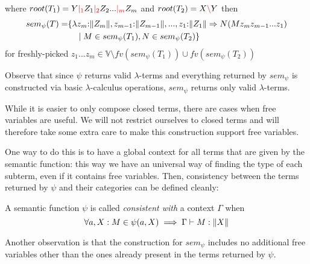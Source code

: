 \documentclass[main.tex]{subfiles}
\begin{document}
\begin{defn}
\begin{enumerate}
\begin{center}
            \end{center}
            where $root(T_1) = Y \textcolor{red}{|_{1}} Z_1 \textcolor{red}{|_{2}} Z_2 ... \textcolor{red}{|_{m}} Z_m$ and $root(T_2) = X \textcolor{red}{\backslash} Y$ then
            \[
                \begin{split}
                    sem_{\psi}(T) =& \{
                        \lambda z_m {:} \|Z_m\|, z_{m - 1} {:} \|Z_{m - 1}\|, ..., z_1 {:} \|Z_1\| \Rightarrow
                        N ( M z_m z_{m - 1} ... z_1 ) \\
                        & \quad \mid M \in sem_{\psi}(T_1), N \in sem_{\psi}(T_2) \} \\
                \end{split}
            \]
            for freshly-picked
            $z_1 ... z_m \in \mathbb{V} \setminus fv(sem_{\psi}(T_1)) \cup fv(sem_{\psi}(T_2))$
    \end{enumerate}
\end{defn}

Observe that since $\psi$ returns valid $\lambda$-terms and everything
returned by $sem_{\psi}$ is constructed via basic $\lambda$-calculus operations,
$sem_{\psi}$ returns only valid $\lambda$-terms.

While it is easier to only compose closed terms, there are cases when free
variables are useful. We will not restrict ourselves to closed terms and will
therefore take some extra care to make this construction support free variables.

One way to do this is to have a global context for all terms that are given
by the semantic function: this way we have an universal way of finding the
type of each subterm, even if it contains free variables. Then, consistency
between the terms returned by $\psi$ and their categories can be defined
cleanly:

\begin{defn}
    A semantic function $\psi$ is called \emph{consistent with} a context
    $\Gamma$ when
    \[
        \forall a, X: M \in \psi(a, X) \implies \Gamma \vdash M : \|X\|
    \]
\end{defn}

Another observation is that the construction for $sem_{\psi}$ includes no
additional free variables other than the ones already present in the terms
returned by $\psi$.
\end{document}
